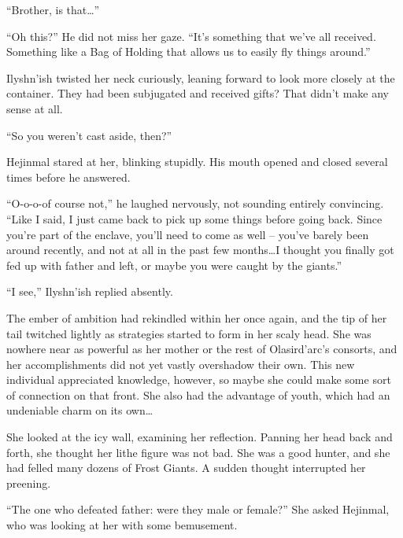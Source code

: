 

“Brother, is that…”

 

“Oh this?” He did not miss her gaze. “It’s something that we’ve all received. Something like a Bag of Holding that allows us to easily fly things around.”

 

Ilyshn’ish twisted her neck curiously, leaning forward to look more closely at the container. They had been subjugated and received gifts? That didn’t make any sense at all.

 

“So you weren’t cast aside, then?”

 

Hejinmal stared at her, blinking stupidly. His mouth opened and closed several times before he answered.

 

“O-o-o-of course not,” he laughed nervously, not sounding entirely convincing. “Like I said, I just came back to pick up some things before going back. Since you’re part of the enclave, you’ll need to come as well – you’ve barely been around recently, and not at all in the past few months…I thought you finally got fed up with father and left, or maybe you were caught by the giants.”

 

“I see,” Ilyshn’ish replied absently.

 

The ember of ambition had rekindled within her once again, and the tip of her tail twitched lightly as strategies started to form in her scaly head. She was nowhere near as powerful as her mother or the rest of Olasird’arc’s consorts, and her accomplishments did not yet vastly overshadow their own. This new individual appreciated knowledge, however, so maybe she could make some sort of connection on that front. She also had the advantage of youth, which had an undeniable charm on its own…

 

She looked at the icy wall, examining her reflection. Panning her head back and forth, she thought her lithe figure was not bad. She was a good hunter, and she had felled many dozens of Frost Giants. A sudden thought interrupted her preening.

 

“The one who defeated father: were they male or female?” She asked Hejinmal, who was looking at her with some bemusement.

